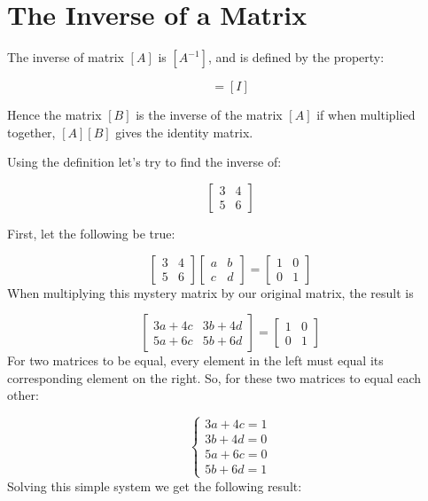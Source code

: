 \section{The Inverse of a Matrix}\label{the-inverse-of-a-matrix}

The inverse of matrix \([A]\) is \([A^{-1}]\), and is defined by the
property:

\begin{equation} [A][A^{-1}]=[I] \end{equation}

Hence the matrix \([B]\) is the inverse of the matrix \([A]\) if when
multiplied together, \([A][B]\) gives the identity matrix. 

Using the definition let's try to find the inverse of:

\[
\begin{bmatrix}
3 & 4\\
5 & 6
\end{bmatrix}
\]

First, let the following be true:

\[
\begin{bmatrix}
3 & 4\\
5 & 6
\end{bmatrix}
\begin{bmatrix}
a & b\\
c & d
\end{bmatrix}
=
\begin{bmatrix}
1 & 0\\
0 & 1
\end{bmatrix}
\]
When multiplying this mystery matrix by our original matrix, the result is

\[
\begin{bmatrix}
3a+4c & 3b+4d\\
5a+6c & 5b+6d
\end{bmatrix}
=
\begin{bmatrix}
1 & 0\\
0 & 1
\end{bmatrix}
\]
For two matrices to be equal, every element in the left must equal its
corresponding element on the right. So, for these two matrices to equal
each other:

\[
\begin{cases}
3a+4c=1\\
3b+4d=0\\
5a+6c=0\\
5b+6d=1
\end{cases}
\]
Solving this simple system we get the following result:

